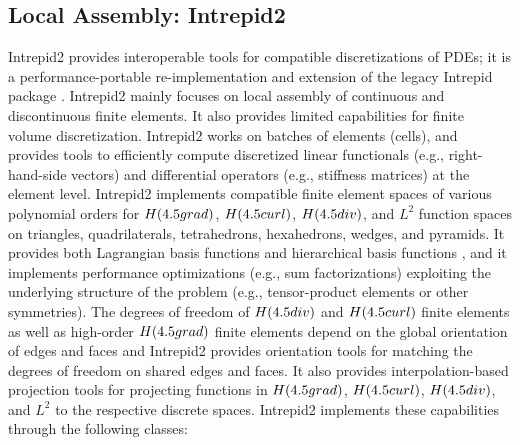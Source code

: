 \subsection{Local Assembly: Intrepid2}
Intrepid2 provides interoperable tools for compatible discretizations of PDEs; it is a performance\hyp{}portable re-implementation and extension of the legacy Intrepid package \cite{bochev2012}. Intrepid2 mainly focuses on local assembly of continuous and discontinuous finite elements. It also provides limited capabilities for finite volume discretization.  Intrepid2 works on batches of elements (cells), and provides tools to efficiently compute discretized linear functionals (e.g., right-hand-side vectors) and differential operators (e.g., stiffness matrices) at the element level. Intrepid2 implements compatible finite element spaces of various polynomial orders for $H({\rm grad})$, $H({\rm curl})$, $H({\rm div})$, and $L^2$ function spaces on triangles, quadrilaterals, tetrahedrons, hexahedrons, wedges, and pyramids. It provides both Lagrangian basis functions and hierarchical basis functions \cite{fuentes2015}, and it implements performance optimizations (e.g., sum factorizations) exploiting the underlying structure of the problem (e.g., tensor-product elements or other symmetries).  The degrees of freedom of $H({\rm div})$ and $H({\rm curl})$ finite elements as well as high-order $H({\rm grad})$ finite elements depend on the global orientation of edges and faces and Intrepid2 provides orientation tools for matching the degrees of freedom on shared edges and faces. It also provides interpolation-based projection tools for projecting functions in $H({\rm grad})$, $H({\rm curl})$, $H({\rm div})$, and $L^2$ to the respective discrete spaces. Intrepid2 implements these capabilities through the following classes:
